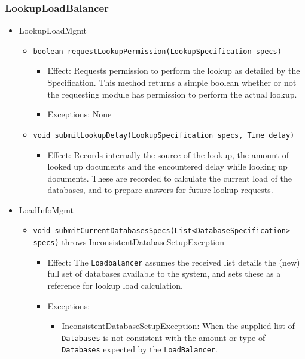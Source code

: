 \documentclass[a4paper,10pt]{article}
\begin{document}
\subsubsection*{LookupLoadBalancer}
\begin{itemize}
    \item LookupLoadMgmt
    \begin{itemize}
        \item \texttt{boolean requestLookupPermission(LookupSpecification specs)}
        \begin{itemize}
            \item Effect: Requests permission to perform the lookup as detailed by the Specification. This method returns a simple boolean whether or not the requesting module has permission to perform the actual lookup.
            \item Exceptions: None
        \end{itemize}

        \item \texttt{void submitLookupDelay(LookupSpecification specs, Time delay)}
        \begin{itemize}
            \item Effect: Records internally the source of the lookup, the amount of looked up documents and the encountered delay while looking up documents. These are recorded to calculate the current load of the databases, and to prepare answers for future lookup requests.
        \end{itemize}
    \end{itemize}

    \item LoadInfoMgmt
    \begin{itemize}
        \item \texttt{void submitCurrentDatabasesSpecs(List<DatabaseSpecification> specs)} throws InconsistentDatabaseSetupException
        \begin{itemize}
            \item Effect: The \texttt{Loadbalancer} assumes the received list details the (new) full set of databases available to the system, and sets these as a reference for lookup load calculation.
            \item Exceptions:
            \begin{itemize}
                \item InconsistentDatabaseSetupException: When the supplied list of \texttt{Databases} is not consistent with the amount or type of \texttt{Databases} expected by the \texttt{LoadBalancer}.
            \end{itemize}
        \end{itemize}
    \end{itemize}
\end{itemize}
\end{document}
